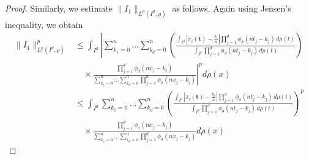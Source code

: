 \documentclass[12pt, reqno]{amsart}
\numberwithin{equation}{section}
\theoremstyle{definition}
\theoremstyle{remark}
\numberwithin{equation}{section}
\newcommand{\LP}{L^p(I^d, \rho)}
\begin{document}
\begin{proof}
Similarly, we estimate $\|I_1\|_{\LP}$ as follows. Again using Jensen's inequality, we obtain
\begin{align}
\|I_1\|^p_{\LP} 
&\leq \int_{I^d} \left| \sum_{k_1=0}^n \ldots \sum_{k_d=0}^n \left( \frac{\int_{I^d} \left|\pi_i(\mathbf{t}) - \frac{k_i}{n}\right| \prod_{j=1}^d \phi_\sigma(nt_j - k_j) \, d\rho(t)}{\int_{I^d} \prod_{j=1}^d \phi_\sigma(nt_j - k_j) \, d\rho(t)} \right) \right. \nonumber \\
&\quad \times \left. \frac{\prod_{j=1}^d \phi_\sigma(nx_j - k_j)}{\sum_{k_1=0}^n \ldots \sum_{k_d=0}^n \prod_{j=1}^d \phi_\sigma(nx_j - k_j)} \right|^p d\rho(x)\nonumber \\
&\leq \int_{I^d} \sum_{k_1=0}^n \ldots \sum_{k_d=0}^n \left( \frac{\int_{I^d} \left|\pi_i(\mathbf{t}) - \frac{k_i}{n}\right| \prod_{j=1}^d \phi_\sigma(nt_j - k_j) \, d\rho(t)}{\int_{I^d} \prod_{j=1}^d \phi_\sigma(nt_j - k_j) \, d\rho(t)} \right)^p \nonumber\\
&\quad \times \frac{\prod_{j=1}^d \phi_\sigma(nx_j - k_j)}{\sum_{k_1=0}^n \ldots \sum_{k_d=0}^n \prod_{j=1}^d \phi_\sigma(nx_j - k_j)}  d\rho(x) \nonumber
\end{align}


\end{proof}
\end{document}
